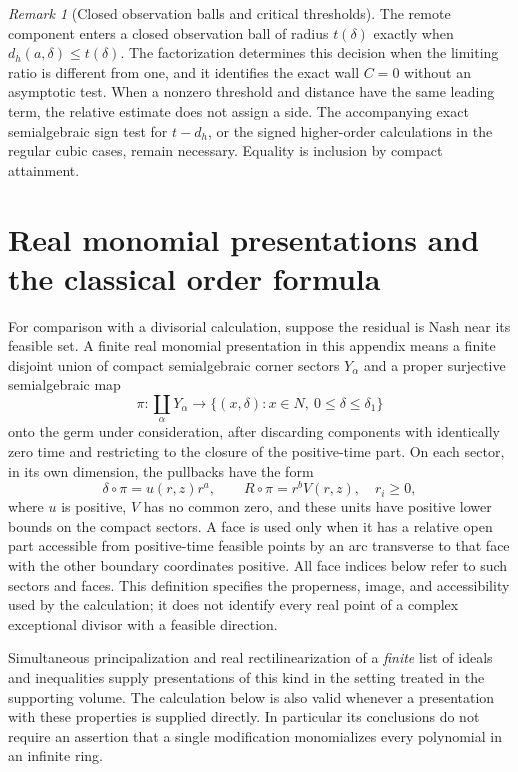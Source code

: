 \documentclass[11pt,reqno]{amsart}
\numberwithin{equation}{section}
\theoremstyle{definition}
\theoremstyle{remark}
\newtheorem{remark}[theorem]{Remark}
\begin{document}
\begin{remark}[Closed observation balls and critical thresholds]\label{rem:threshold}
The remote component enters a closed observation ball of radius $t(\delta)$ exactly when $d_h(a,\delta)\le t(\delta)$. The factorization determines this decision when the limiting ratio is different from one, and it identifies the exact wall $C=0$ without an asymptotic test. When a nonzero threshold and distance have the same leading term, the relative estimate does not assign a side. The accompanying exact semialgebraic sign test for $t-d_h$, or the signed higher-order calculations in the regular cubic cases, remain necessary. Equality is inclusion by compact attainment.
\end{remark}

\appendix
\section{Real monomial presentations and the classical order formula}\label{app:divisors}
For comparison with a divisorial calculation, suppose the residual is Nash near its feasible set. A finite real monomial presentation in this appendix means a finite disjoint union of compact semialgebraic corner sectors $Y_\alpha$ and a proper surjective semialgebraic map
\[
 \pi:\coprod_\alpha Y_\alpha\longrightarrow
           \{(x,\delta):x\in N,\ 0\le\delta\le\delta_1\}
\]
onto the germ under consideration, after discarding components with identically zero time and restricting to the closure of the positive-time part. On each sector, in its own dimension, the pullbacks have the form
\begin{equation}\label{eq:monomial}
 \delta\circ\pi=u(r,z)r^a,\qquad R\circ\pi=r^b V(r,z),
 \quad r_i\ge0,
\end{equation}
where $u$ is positive, $V$ has no common zero, and these units have positive lower bounds on the compact sectors. A face is used only when it has a relative open part accessible from positive-time feasible points by an arc transverse to that face with the other boundary coordinates positive. All face indices below refer to such sectors and faces. This definition specifies the properness, image, and accessibility used by the calculation; it does not identify every real point of a complex exceptional divisor with a feasible direction.

Simultaneous principalization and real rectilinearization of a \emph{finite} list of ideals and inequalities supply presentations of this kind in the setting treated in the supporting volume. The calculation below is also valid whenever a presentation with these properties is supplied directly. In particular its conclusions do not require an assertion that a single modification monomializes every polynomial in an infinite ring.
\end{document}
